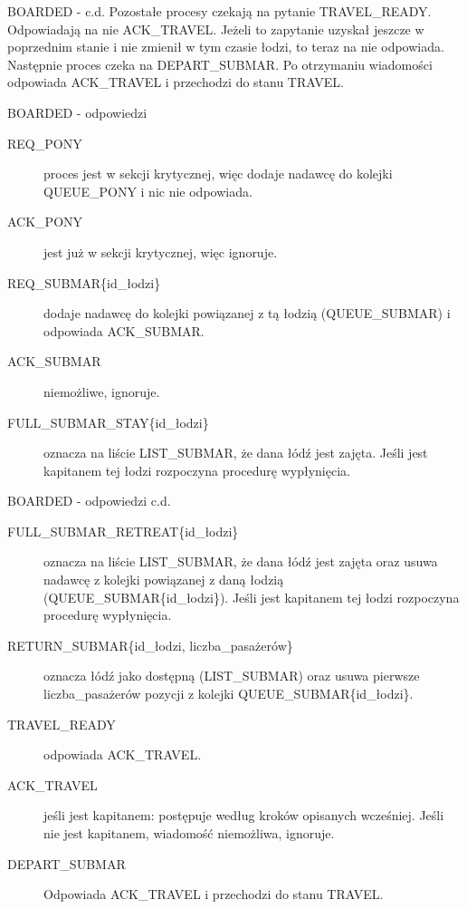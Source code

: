 \documentclass{beamer}
\begin{document}
\begin{frame}{BOARDED - c.d.}
    \internallinenumbers
    \resetlinenumber[1]
    Pozostałe procesy czekają na pytanie TRAVEL\_READY. Odpowiadają na nie ACK\_TRAVEL. Jeżeli to zapytanie uzyskał jeszcze w poprzednim stanie i nie zmienił w tym czasie łodzi, to teraz na nie odpowiada. \\
    Następnie proces czeka na DEPART\_SUBMAR. Po otrzymaniu wiadomości odpowiada ACK\_TRAVEL i przechodzi do stanu TRAVEL.
\end{frame}

\begin{frame}{BOARDED - odpowiedzi}
    \internallinenumbers
    \resetlinenumber[1]
    \begin{description}
        \item [REQ\_PONY] proces jest w sekcji krytycznej, więc dodaje nadawcę do kolejki QUEUE\_PONY i nic nie odpowiada. 
        \item [ACK\_PONY] jest już w sekcji krytycznej, więc ignoruje.
        \item [REQ\_SUBMAR\{id\_łodzi\}] dodaje nadawcę do kolejki powiązanej z tą łodzią (QUEUE\_SUBMAR) i odpowiada ACK\_SUBMAR.
        \item [ACK\_SUBMAR] niemożliwe, ignoruje.
        \item [FULL\_SUBMAR\_STAY\{id\_łodzi\}] oznacza na liście LIST\_SUBMAR, że dana łódź jest zajęta. Jeśli jest kapitanem tej łodzi rozpoczyna procedurę wypłynięcia.

    \end{description}
\end{frame}

\begin{frame}{BOARDED - odpowiedzi c.d.}
    \internallinenumbers
    \resetlinenumber[1]
    \begin{description}
        \item [FULL\_SUBMAR\_RETREAT\{id\_łodzi\}] oznacza na liście LIST\_SUBMAR, że dana łódź jest zajęta oraz usuwa nadawcę z kolejki powiązanej z daną łodzią (QUEUE\_SUBMAR\{id\_łodzi\}). Jeśli jest kapitanem tej łodzi rozpoczyna procedurę wypłynięcia.
        \item [RETURN\_SUBMAR\{id\_łodzi, liczba\_pasażerów\}] oznacza łódź jako dostępną (LIST\_SUBMAR) oraz usuwa pierwsze liczba\_pasażerów pozycji z kolejki QUEUE\_SUBMAR\{id\_łodzi\}.
        \item [TRAVEL\_READY] odpowiada ACK\_TRAVEL.
        \item [ACK\_TRAVEL] jeśli jest kapitanem: postępuje według kroków opisanych wcześniej. Jeśli nie jest kapitanem, wiadomość niemożliwa, ignoruje.
        \item [DEPART\_SUBMAR] Odpowiada ACK\_TRAVEL i przechodzi do stanu TRAVEL.
    \end{description}
\end{frame}
\end{document}
